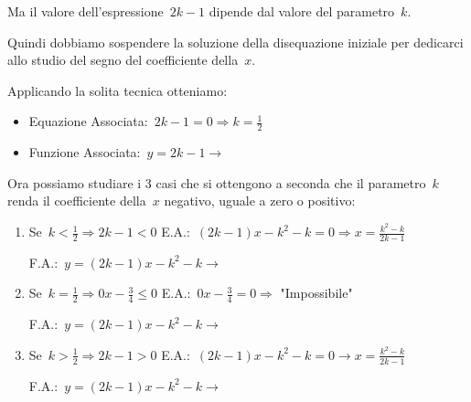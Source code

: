 Ma il valore dell'espressione~$2 k - 1$ dipende dal valore del
parametro~$k$.

Quindi dobbiamo sospendere la soluzione della disequazione iniziale per
dedicarci allo studio del segno del coefficiente della~$x$.

Applicando la solita tecnica otteniamo:

\begin{itemize} [noitemsep]
 \item
  Equazione Associata:~$2 k -1=0 \Rightarrow k=\frac{1}{2}$
 \item
  \begin{minipage}{.40\textwidth}
  Funzione Associata:~$y=2 k -1 \rightarrow$
  \end{minipage}
  \begin{minipage}{.30\textwidth}
  
  \end{minipage}
\end{itemize}

Ora possiamo studiare i 3 casi che si ottengono a seconda che il
parametro~$k$ renda il coefficiente della~$x$ negativo, uguale a zero
o positivo:

\begin{enumerate}
 \item Se~$k < \frac{1}{2} \Rightarrow 2 k - 1 < 0$
 \subitem E.A.:~$(2 k - 1) x - k^2 - k = 0 \Rightarrow x=\frac{k^2 - k}{2 k -
1}$
 \subitem
  \begin{minipage}{.4\textwidth}
   F.A.:~$y=(2 k - 1) x - k^2 - k \rightarrow$
  \end{minipage}
  \begin{minipage}{.30\textwidth}
  
  \end{minipage}
 \item Se~$k = \frac{1}{2} \Rightarrow 0 x - \frac{3}{4} \le 0$
  \subitem E.A.:~$0 x - \frac{3}{4} = 0 \Rightarrow$ "Impossibile"
  \subitem
  \begin{minipage}{.4\textwidth}
   F.A.:~$y=(2 k - 1) x - k^2 - k \rightarrow$
  \end{minipage}
  \begin{minipage}{.30\textwidth}
  
  \end{minipage}
 \item Se~$k > \frac{1}{2} \Rightarrow 2 k - 1 > 0$
  \subitem E.A.:~$(2 k - 1 ) x - k^2 - k = 0 \rightarrow x=\frac{k^2 - k}{2 k -
1}$
  \subitem
  \begin{minipage}{.4\textwidth}
   F.A.:~$y=(2 k - 1 ) x - k^2 - k \rightarrow$
  \end{minipage}
  \begin{minipage}{.30\textwidth}
  
  \end{minipage}
\end{enumerate}

